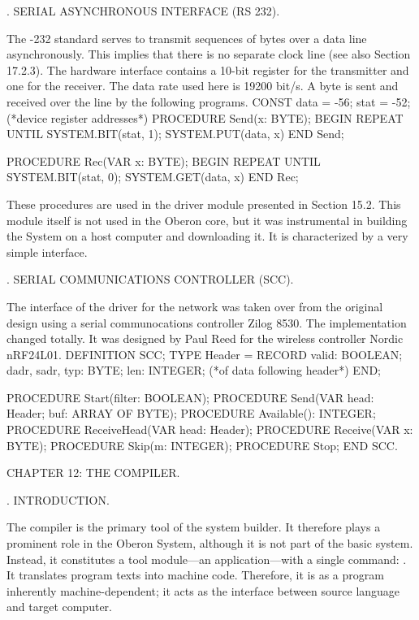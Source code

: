 . SERIAL ASYNCHRONOUS INTERFACE (RS 232).

The -232 standard serves to transmit sequences of bytes over a data line asynchronously. This implies that there is no separate clock line (see also Section 17.2.3). The hardware interface contains a 10-bit register for the transmitter and one for the receiver. The data rate used here is 19200 bit/s. A byte is sent and received over the line by the following programs.
\begintt
CONST data = -56; stat = -52; (*device register addresses*)
PROCEDURE Send(x: BYTE);
BEGIN
  REPEAT UNTIL SYSTEM.BIT(stat, 1);
  SYSTEM.PUT(data, x)
END Send;

PROCEDURE Rec(VAR x: BYTE);
BEGIN
  REPEAT UNTIL SYSTEM.BIT(stat, 0);
  SYSTEM.GET(data, x)
END Rec;
\endtt

\noindent These procedures are used in the driver module  presented in Section 15.2. This module itself is not used in the Oberon core, but it was instrumental in building the System on a host computer and downloading it. It is characterized by a very simple interface.

. SERIAL COMMUNICATIONS CONTROLLER (SCC).

The interface of the driver for the network was taken over from the original design using a serial communocations controller Zilog 8530. The implementation changed totally. It was designed by Paul Reed for the wireless controller Nordic nRF24L01.
\begintt
DEFINITION SCC;
TYPE Header =
  RECORD valid: BOOLEAN; dadr, sadr, typ: BYTE;
    len: INTEGER; (*of data following header*)
  END;
  
PROCEDURE Start(filter: BOOLEAN);
PROCEDURE Send(VAR head: Header; buf: ARRAY OF BYTE);
PROCEDURE Available(): INTEGER;
PROCEDURE ReceiveHead(VAR head: Header);
PROCEDURE Receive(VAR x: BYTE);
PROCEDURE Skip(m: INTEGER);
PROCEDURE Stop;
END SCC.
\endtt

\beginchapter CHAPTER 12: THE COMPILER.

. INTRODUCTION.

The compiler is the primary tool of the system builder. It therefore plays a prominent role in the Oberon System, although it is not part of the basic system. Instead, it constitutes a tool module---an application---with a single command: . It translates program texts into machine code. Therefore, it is as a program inherently machine-dependent; it acts as the interface between source language and target computer.

